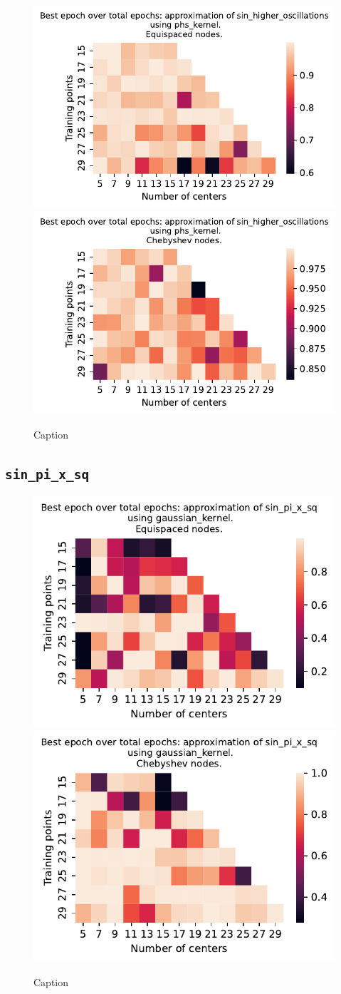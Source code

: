 \documentclass[12pt]{report} %
\begin{document}
\begin{figure}[ht]
    \centering
    
    \includegraphics[width=.49\textwidth]{imagenes/experiments/1d/variational_epochs/sin_higher_oscillations-Kphs_kernel-Equi-epochs.pdf}
    \includegraphics[width=.49\textwidth]{imagenes/experiments/1d/variational_epochs/sin_higher_oscillations-Kphs_kernel-Cheb-epochs.pdf}
    \caption{Caption}
    \label{fig:epochs-sin-higher-oscillations-phs}
\end{figure}

\subsection*{\texttt{sin\_pi\_x\_sq}}

\begin{figure}[ht]
    \centering
    
    \includegraphics[width=.49\textwidth]{imagenes/experiments/1d/variational_epochs/sin_pi_x_sq-Kgaussian_kernel-Equi-epochs.pdf}
    \includegraphics[width=.49\textwidth]{imagenes/experiments/1d/variational_epochs/sin_pi_x_sq-Kgaussian_kernel-Cheb-epochs.pdf}
    \caption{Caption}
    \label{fig:epochs-sin-pi-x-sq-gaussian}
\end{figure}
\end{document}
